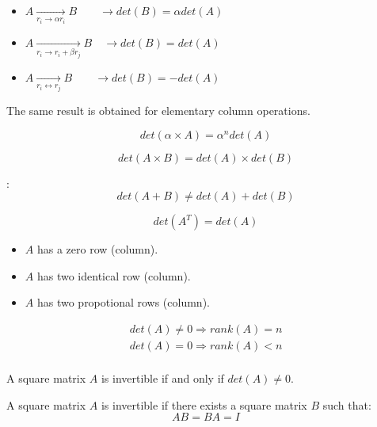       \begin{itemize}
        \item $A \xrightarrow[r_{i} \to \alpha r_{i}]{} B \quad \quad
          \rightarrow det(B) = \alpha det(A)$
        \item $A \xrightarrow[r_{i} \to r_{i} + \beta r_{j}]{} B \quad
          \rightarrow det(B) = det(A)$
        \item $A \xrightarrow[r_{i} \leftrightarrow r_{j}]{} B \quad \quad
          \rightarrow det(B) = - det(A)$
      \end{itemize}
      \par The same result is obtained for elementary column operations.

      \[
        det(\alpha \times A) = \alpha^{n} det(A)
      \]

      \[
        det(A \times B) = det(A) \times det(B)
      \]
      \par {}:
      \[
        det(A + B) \neq det(A) + det(B)
      \]

      \[
        det(A^{T}) = det(A)
      \]

      \begin{itemize}
        \item $A$ has a zero row (column).
        \item $A$ has two identical row (column).
        \item $A$ has two propotional rows (column).
      \end{itemize}

      \begin{align*}
        det(A) \neq 0 \Rightarrow rank(A) = n \\
        det(A) = 0 \Rightarrow rank(A) < n \\
      \end{align*}


    \par A square matrix $A$ is invertible if and only if $det(A) \neq 0$.

    \par A square matrix $A$ is invertible if there exists a square matrix $B$
    such that:
    \[
      AB = BA = I
    \]


